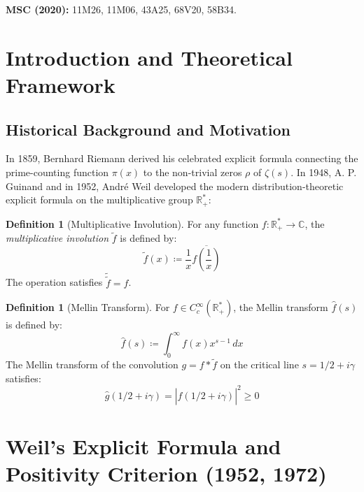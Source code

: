 \documentclass[11pt,a4paper]{article}
\theoremstyle{definition}
\newtheorem{definition}[theorem]{Definition}
\begin{document}
\noindent\textbf{MSC (2020):} 11M26, 11M06, 43A25, 68V20, 58B34.

\tableofcontents
\newpage

\section{Introduction and Theoretical Framework}

\subsection{Historical Background and Motivation}
In 1859, Bernhard Riemann \cite{riemann1859} derived his celebrated explicit formula connecting the prime-counting function $\pi(x)$ to the non-trivial zeros $\rho$ of $\zeta(s)$.
In 1948, A. P. Guinand and in 1952, Andr\'e Weil \cite{weil1952} developed the modern distribution-theoretic explicit formula on the multiplicative group $\mathbb{R}_+^*$:

\begin{definition}[Multiplicative Involution]\label{def:involution}
For any function $f : \mathbb{R}_+^* \to \mathbb{C}$, the \emph{multiplicative involution} $\tilde{f}$ is defined by:
\begin{equation}\label{eq:involution_def}
\tilde{f}(x) \coloneqq \frac{1}{x} \overline{f\left( \frac{1}{x} \right)}
\end{equation}
The operation satisfies $\widetilde{\tilde{f}} = f$.
\end{definition}

\begin{definition}[Mellin Transform]\label{def:mellin_trans}
For $f \in C_c^\infty(\mathbb{R}_+^*)$, the Mellin transform $\hat{f}(s)$ is defined by:
\begin{equation}\label{eq:mellin_def}
\hat{f}(s) \coloneqq \int_0^\infty f(x) x^{s - 1} \, dx
\end{equation}
The Mellin transform of the convolution $g = f \ast \tilde{f}$ on the critical line $s = 1/2 + i\gamma$ satisfies:
\begin{equation}\label{eq:mellin_sq}
\hat{g}(1/2 + i\gamma) = |\hat{f}(1/2 + i\gamma)|^2 \ge 0
\end{equation}
\end{definition}

\section{Weil's Explicit Formula and Positivity Criterion (1952, 1972)}
\end{document}

